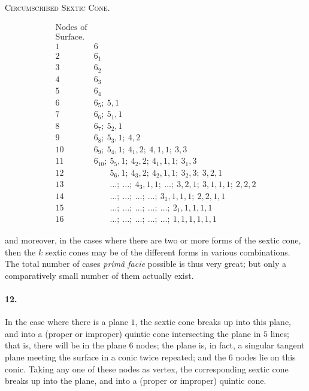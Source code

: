 \documentclass[11pt,a4paper]{article}
\begin{document}
\medskip
\begin{center}
\textsc{Circumscribed Sextic Cone.}
\end{center}
\[
\begin{array}{c|l}
\text{Nodes of} & \\
\text{Surface.} & \\\hline
1  & 6 \\
2  & 6_1 \\
3  & 6_2 \\
4  & 6_3 \\
5  & 6_4 \\
6  & 6_5;\ 5, 1 \\
7  & 6_6;\ 5_1, 1 \\
8  & 6_7;\ 5_2, 1 \\
9  & 6_8;\ 5_3, 1;\ 4, 2 \\
10 & 6_9;\ 5_4, 1;\ 4_1, 2;\ 4, 1, 1;\ 3, 3 \\
11 & 6_{10};\ 5_5, 1;\ 4_2, 2;\ 4_1, 1, 1;\ 3_1, 3 \\
12 & \phantom{6_{10};}\ 5_6, 1;\ 4_3, 2;\ 4_2, 1, 1;\ 3_2, 3;\ 3, 2, 1 \\
13 & \phantom{6_{10};}\ \ldots;\ \ldots;\ 4_3, 1, 1;\ \ldots;\ 3, 2, 1;\ 3, 1, 1, 1;\ 2, 2, 2 \\
14 & \phantom{6_{10};}\ \ldots;\ \ldots;\ \ldots;\ \ldots;\ 3_1, 1, 1, 1;\ 2, 2, 1, 1 \\
15 & \phantom{6_{10};}\ \ldots;\ \ldots;\ \ldots;\ \ldots;\ \ldots;\ 2_1, 1, 1, 1, 1 \\
16 & \phantom{6_{10};}\ \ldots;\ \ldots;\ \ldots;\ \ldots;\ \ldots;\ 1, 1, 1, 1, 1, 1
\end{array}
\]

and moreover, in the cases where there are two or more forms of the sextic cone, then the
$k$ sextic cones may be of the different forms in various combinations. The total number of
cases \textit{prim\^a facie} possible is thus very great; but only a comparatively small
number of them actually exist.

\paragraph{12.}
In the case where there is a plane $1$, the sextic cone breaks up into this plane, and into
a (proper or improper) quintic cone intersecting the plane in $5$ lines; that is, there
will be in the plane $6$ nodes; the plane is, in fact, a singular tangent plane meeting the
surface in a conic twice repeated; and the $6$ nodes lie on this conic. Taking any one of
these nodes as vertex, the corresponding sextic cone breaks up into the plane, and into a
(proper or improper) quintic cone.
\end{document}

